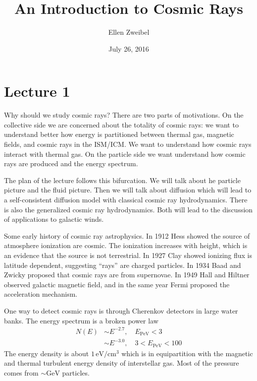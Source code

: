 \documentclass[letterpaper, 11pt]{article}
\numberwithin{equation}{section}
\numberwithin{figure}{section}
\begin{document}
\title{An Introduction to Cosmic Rays}
\author{Ellen Zweibel}
\date{July 26, 2016}

\maketitle

\section{Lecture 1}

Why should we study cosmic rays? There are two parts of motivations. On the
collective side we are concerned about the totality of cosmic rays: we want to
understand better how energy is partitioned between thermal gas, magnetic
fields, and cosmic rays in the ISM/ICM. We want to understand how cosmic rays
interact with thermal gas. On the particle side we want understand how cosmic
rays are produced and the energy spectrum.

The plan of the lecture follows this bifurcation. We will talk about he particle
picture and the fluid picture. Then we will talk about diffusion which will lead
to a self-consistent diffusion model with classical cosmic ray hydrodynamics.
There is also the generalized cosmic ray hydrodynamics. Both will lead to the
discussion of applications to galactic winds.

Some early history of cosmic ray astrophysics. In 1912 Hess showed the source of
atmosphere ionization are cosmic. The ionization increases with height, which is
an evidence that the source is not terrestrial. In 1927 Clay showed ionizing
flux is latitude dependent, suggesting ``rays'' are charged particles. In 1934
Baad and Zwicky proposed that cosmic rays are from supernovae. In 1949 Hall and
Hiltner observed galactic magnetic field, and in the same year Fermi proposed the
acceleration mechanism.

One way to detect cosmic rays is through Cherenkov detectors in large water
banks. The energy spectrum is a broken power law
\begin{equation}
  \label{eq:1}
  \begin{split}
    N(E) &\sim E^{-2.7}, \quad E_\mathrm{PeV} < 3 \\
    &\sim E^{-3.0}, \quad 3 < E_\mathrm{PeV} < 100
  \end{split}
\end{equation}
The energy density is about $1\,\mathrm{eV/cm^{3}}$ which is in equipartition
with the magnetic and thermal turbulent energy density of interstellar gas.
Most of the pressure comes from $\sim \mathrm{GeV}$ particles.
\end{document}
